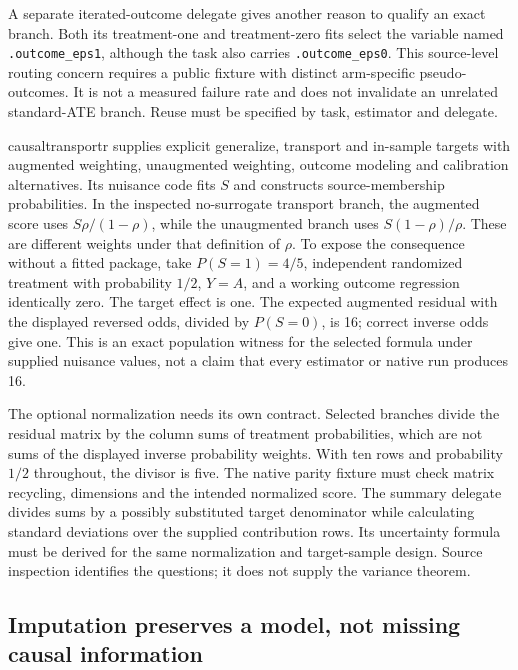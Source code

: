 A separate iterated-outcome delegate gives another reason to qualify an exact branch. Both its treatment-one and treatment-zero fits select the variable named \texttt{.outcome\_eps1}, although the task also carries \texttt{.outcome\_eps0}. This source-level routing concern requires a public fixture with distinct arm-specific pseudo-outcomes. It is not a measured failure rate and does not invalidate an unrelated standard-ATE branch. Reuse must be specified by task, estimator and delegate.~\citep{exec25_rtm_transportr}

causaltransportr supplies explicit generalize, transport and in-sample targets with augmented weighting, unaugmented weighting, outcome modeling and calibration alternatives. Its nuisance code fits $S$ and constructs source-membership probabilities. In the inspected no-surrogate transport branch, the augmented score uses $S\rho/(1-\rho)$, while the unaugmented branch uses $S(1-\rho)/\rho$. These are different weights under that definition of $\rho$. To expose the consequence without a fitted package, take $P(S=1)=4/5$, independent randomized treatment with probability $1/2$, $Y=A$, and a working outcome regression identically zero. The target effect is one. The expected augmented residual with the displayed reversed odds, divided by $P(S=0)$, is 16; correct inverse odds give one. This is an exact population witness for the selected formula under supplied nuisance values, not a claim that every estimator or native run produces 16.~\citep{exec25_rtm_causaltransportr,exec25_rtm_choice}

The optional normalization needs its own contract. Selected branches divide the residual matrix by the column sums of treatment probabilities, which are not sums of the displayed inverse probability weights. With ten rows and probability $1/2$ throughout, the divisor is five. The native parity fixture must check matrix recycling, dimensions and the intended normalized score. The summary delegate divides sums by a possibly substituted target denominator while calculating standard deviations over the supplied contribution rows. Its uncertainty formula must be derived for the same normalization and target-sample design. Source inspection identifies the questions; it does not supply the variance theorem.~\citep{exec25_rtm_causaltransportr,exec25_rtm_choice}

\subsection{Imputation preserves a model, not missing causal information}

